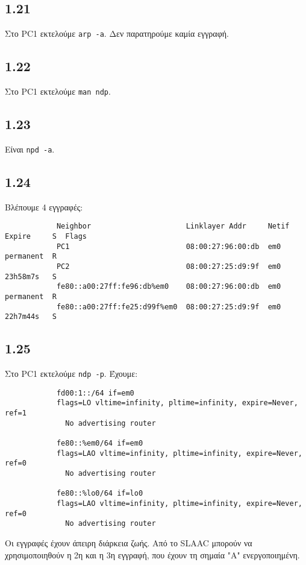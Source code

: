 \documentclass[a4paper, 12pt]{article}
\begin{document}
	\subsection*{1.21}
		Στο PC1 εκτελούμε \verb|arp -a|. Δεν παρατηρούμε καμία εγγραφή.

	\subsection*{1.22}
		Στο PC1 εκτελούμε \verb|man ndp|.

	\subsection*{1.23}
		Είναι \verb|npd -a|.

	\subsection*{1.24}
		Βλέπουμε 4 εγγραφές:
		
		\begin{verbatim}
			Neighbor                      Linklayer Addr     Netif  Expire     S  Flags
			PC1                           08:00:27:96:00:db  em0    permanent  R
			PC2                           08:00:27:25:d9:9f  em0    23h58m7s   S
			fe80::a00:27ff:fe96:db%em0    08:00:27:96:00:db  em0    permanent  R
			fe80::a00:27ff:fe25:d99f%em0  08:00:27:25:d9:9f  em0    22h7m44s   S
		\end{verbatim}

	\subsection*{1.25}
		Στο PC1 εκτελούμε \verb|ndp -p|. Έχουμε:
		
		\begin{verbatim}
			fd00:1::/64 if=em0
			flags=LO vltime=infinity, pltime=infinity, expire=Never, ref=1
			  No advertising router
			
			fe80::%em0/64 if=em0
			flags=LAO vltime=infinity, pltime=infinity, expire=Never, ref=0
			  No advertising router
			
			fe80::%lo0/64 if=lo0
			flags=LAO vltime=infinity, pltime=infinity, expire=Never, ref=0
			  No advertising router
		\end{verbatim}
		
		Οι εγγραφές έχουν άπειρη διάρκεια ζωής. Από το SLAAC μπορούν να χρησιμοποιηθούν η 2η και η 3η εγγραφή, που έχουν τη σημαία "A" ενεργοποιημένη.
\end{document}
